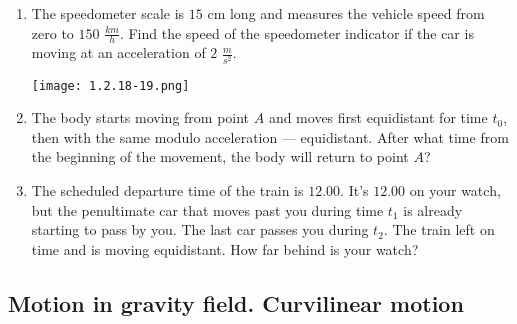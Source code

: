 \documentclass{article}
\begin{document}
\begin{enumerate}[label=1.2.\arabic*]
\item The speedometer scale is $15$ cm long and measures the vehicle speed from zero to $150$ $\frac{km}{h}$. Find the speed of the speedometer indicator if the car is moving at an acceleration of $2$ $\frac{m}{s^2}$.

\begin{center}
    \texttt{[image: 1.2.18-19.png]}
\end{center}

\item The body starts moving from point $A$ and moves first equidistant for time $t_0$, then with the same modulo acceleration — equidistant. After what time from the beginning of the movement, the body will return to point $A$?

\item The scheduled departure time of the train is $12.00$. It's $12.00$ on your watch, but the penultimate car that moves past you during time $t_1$ is already starting to pass by you.
The last car passes you during $t_2$. The train left on time and is moving equidistant. How far behind is your watch?


\end{enumerate}


\subsection{Motion in gravity field. Curvilinear motion}
\end{document}
